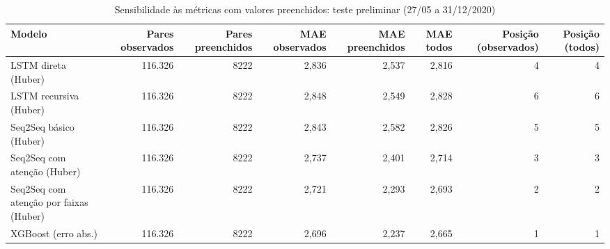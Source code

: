 \begin{table}[!htbp]
    \centering
    \caption{Sensibilidade às métricas com valores preenchidos: teste preliminar (27/05 a 31/12/2020)}
    \label{tab:sensibilidade_imputados_teste_historico}
    \small
    \begin{adjustbox}{max width=\textwidth}
    \begin{tabular}{lrrrrrrr}
        \toprule
        Modelo & Pares observados & Pares preenchidos & MAE observados & MAE preenchidos & MAE todos & Posição (observados) & Posição (todos) \\
        \midrule
        LSTM direta (Huber) & 116.326 & 8222 & 2,836 & 2,537 & 2,816 & 4 & 4 \\
        LSTM recursiva (Huber) & 116.326 & 8222 & 2,848 & 2,549 & 2,828 & 6 & 6 \\
        Seq2Seq básico (Huber) & 116.326 & 8222 & 2,843 & 2,582 & 2,826 & 5 & 5 \\
        Seq2Seq com atenção (Huber) & 116.326 & 8222 & 2,737 & 2,401 & 2,714 & 3 & 3 \\
        Seq2Seq com atenção por faixas (Huber) & 116.326 & 8222 & 2,721 & 2,293 & 2,693 & 2 & 2 \\
        XGBoost (erro abs.) & 116.326 & 8222 & 2,696 & 2,237 & 2,665 & 1 & 1 \\
        \bottomrule
    \end{tabular}
    \end{adjustbox}
\end{table}
